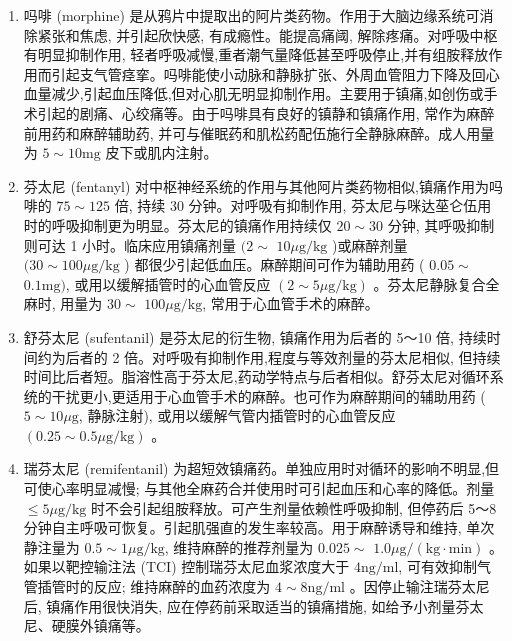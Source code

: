 \documentclass[10pt]{article}
\begin{document}
\begin{enumerate}
  \item 吗啡 (morphine) 是从鸦片中提取出的阿片类药物。作用于大脑边缘系统可消除紧张和焦虑, 并引起欣快感, 有成瘾性。能提高痛阈, 解除疼痛。对呼吸中枢有明显抑制作用, 轻者呼吸减慢,重者潮气量降低甚至呼吸停止,并有组胺释放作用而引起支气管痉挛。吗啡能使小动脉和静脉扩张、外周血管阻力下降及回心血量减少,引起血压降低,但对心肌无明显抑制作用。主要用于镇痛,如创伤或手术引起的剧痛、心绞痛等。由于吗啡具有良好的镇静和镇痛作用, 常作为麻醉前用药和麻醉辅助药, 并可与催眠药和肌松药配伍施行全静脉麻醉。成人用量为 $5 \sim 10 \mathrm{mg}$ 皮下或肌内注射。

  \item 芬太尼 (fentanyl) 对中枢神经系统的作用与其他阿片类药物相似,镇痛作用为吗啡的 $75 \sim 125$ 倍, 持续 30 分钟。对呼吸有抑制作用, 芬太尼与咪达莝仑伍用时的呼吸抑制更为明显。芬太尼的镇痛作用持续仅 $20 \sim 30$ 分钟, 其呼吸抑制则可达 1 小时。临床应用镇痛剂量 $(2 \sim$ $10 \mu \mathrm{g} / \mathrm{kg}$ )或麻醉剂量 $(30 \sim 100 \mu \mathrm{g} / \mathrm{kg}$ ) 都很少引起低血压。麻醉期间可作为辅助用药 ( $0.05 \sim$ $0.1 \mathrm{mg})$, 或用以缓解插管时的心血管反应 $(2 \sim 5 \mu \mathrm{g} / \mathrm{kg})$ 。芬太尼静脉复合全麻时, 用量为 $30 \sim$ $100 \mu \mathrm{g} / \mathrm{kg}$, 常用于心血管手术的麻醉。

  \item 舒芬太尼 (sufentanil) 是芬太尼的衍生物, 镇痛作用为后者的 5～10 倍, 持续时间约为后者的 2 倍。对呼吸有抑制作用,程度与等效剂量的芬太尼相似, 但持续时间比后者短。脂溶性高于芬太尼,药动学特点与后者相似。舒芬太尼对循环系统的干扰更小,更适用于心血管手术的麻醉。也可作为麻醉期间的辅助用药 ( $5 \sim 10 \mu \mathrm{g}$, 静脉注射), 或用以缓解气管内插管时的心血管反应 $(0.25 \sim 0.5 \mu \mathrm{g} / \mathrm{kg})$ 。

  \item 瑞芬太尼 (remifentanil) 为超短效镇痛药。单独应用时对循环的影响不明显,但可使心率明显减慢; 与其他全麻药合并使用时可引起血压和心率的降低。剂量 $\leqslant 5 \mu \mathrm{g} / \mathrm{kg}$ 时不会引起组胺释放。可产生剂量依赖性呼吸抑制, 但停药后 5～8 分钟自主呼吸可恢复。引起肌强直的发生率较高。用于麻醉诱导和维持, 单次静注量为 $0.5 \sim 1 \mu \mathrm{g} / \mathrm{kg}$, 维持麻醉的推荐剂量为 $0.025 \sim$ $1.0 \mu \mathrm{g} /(\mathrm{kg} \cdot \mathrm{min})$ 。如果以靶控输注法 (TCI) 控制瑞芬太尼血浆浓度大于 $4 \mathrm{ng} / \mathrm{ml}$, 可有效抑制气管插管时的反应; 维持麻醉的血药浓度为 $4 \sim 8 \mathrm{ng} / \mathrm{ml}$ 。因停止输注瑞芬太尼后, 镇痛作用很快消失, 应在停药前采取适当的镇痛措施, 如给予小剂量芬太尼、硬膜外镇痛等。

\end{enumerate}
\end{document}
